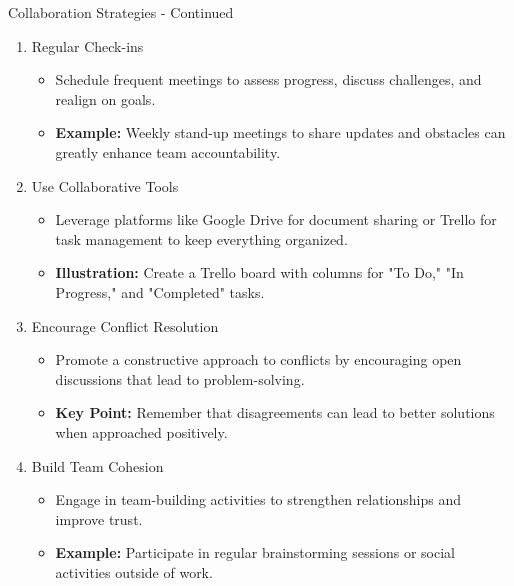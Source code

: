 \documentclass[aspectratio=169]{beamer}
\begin{document}
\begin{frame}[fragile]{Collaboration Strategies - Continued}
  \begin{enumerate}[resume]
    \item Regular Check-ins
    \begin{itemize}
      \item Schedule frequent meetings to assess progress, discuss challenges, and realign on goals.
      \item \textbf{Example:} Weekly stand-up meetings to share updates and obstacles can greatly enhance team accountability.
    \end{itemize}
    
    \item Use Collaborative Tools
    \begin{itemize}
      \item Leverage platforms like Google Drive for document sharing or Trello for task management to keep everything organized.
      \item \textbf{Illustration:} Create a Trello board with columns for "To Do," "In Progress," and "Completed" tasks.
    \end{itemize}
    
    \item Encourage Conflict Resolution
    \begin{itemize}
      \item Promote a constructive approach to conflicts by encouraging open discussions that lead to problem-solving.
      \item \textbf{Key Point:} Remember that disagreements can lead to better solutions when approached positively.
    \end{itemize}
    
    \item Build Team Cohesion
    \begin{itemize}
      \item Engage in team-building activities to strengthen relationships and improve trust.
      \item \textbf{Example:} Participate in regular brainstorming sessions or social activities outside of work.
    \end{itemize}
  \end{enumerate}
\end{frame}
\end{document}

